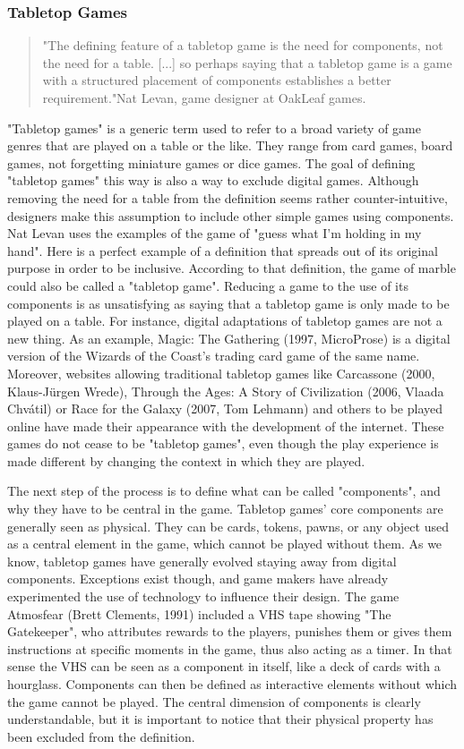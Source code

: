 \subsubsection{Tabletop Games}
\begin{quotation}
"The defining feature of a tabletop game is the need for components, not the need for a table. [...] so perhaps saying that a tabletop game is a game with a structured placement of components establishes a better requirement."Nat Levan, game designer at OakLeaf games.
\end{quotation} 
"Tabletop games" is a generic term used to refer to a broad variety of game genres that are played on a table or the like. They range from card games, board games, not forgetting miniature games or dice games. The goal of defining "tabletop games" this way is also a way to exclude digital games. Although removing the need for a table from the definition seems rather counter-intuitive, designers make this assumption to include other simple games using components. Nat Levan uses the examples of the game of "guess what I’m holding in my hand". Here is a perfect example of a definition that spreads out of its original purpose in order to be inclusive. According to that definition, the game of marble could also be called a "tabletop game". Reducing a game to the use of its components is as unsatisfying as saying that a tabletop game is only made to be played on a table. For instance, digital adaptations of tabletop games are not a new thing. As an example, Magic: The Gathering (1997, MicroProse) is a digital version of the Wizards of the Coast’s trading card game of the same name. Moreover, websites allowing traditional tabletop games like Carcassone (2000, Klaus-Jürgen Wrede), Through the Ages: A Story of Civilization (2006, Vlaada Chvátil) or Race for the Galaxy (2007, Tom Lehmann) and others to be played online have made their appearance with the development of the internet. These games do not cease to be "tabletop games", even though the play experience is made different by changing the context in which they are played.
 

The next step of the process is to define what can be called "components", and why they have to be central in the game. Tabletop games' core components are generally seen as physical. They can be cards, tokens, pawns, or any object used as a central element in the game, which cannot be played without them.  As we know, tabletop games have generally evolved staying away from digital components. Exceptions exist though, and game makers have already experimented the use of technology to influence their design. The game Atmosfear (Brett Clements, 1991) included a VHS tape showing "The Gatekeeper", who attributes rewards to the players, punishes them or gives them instructions at specific moments in the game, thus also acting as a timer. In that sense the VHS can be seen as a component in itself, like a deck of cards with a hourglass. 
Components can then be defined as interactive elements without which the game cannot be played. The central dimension of components is clearly understandable, but it is important to notice that their physical property has been excluded from the definition.


